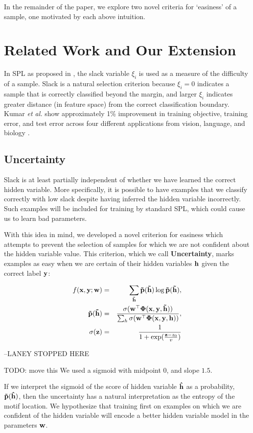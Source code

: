 \documentclass{article}
\newcommand{\mysection}[1]{\vspace{-4mm}\section{#1}\vspace{-4mm}}
\begin{document}
In the remainder of the paper, we explore two novel criteria for `easiness' of a sample, one motivated by each above intuition.

\mysection{Related Work and Our Extension}
\label{sec:related}
In SPL as proposed in \cite{SPL}, the slack variable $\xi_i$ is used as a measure of the difficulty of a sample.  Slack is a natural selection criterion because $\xi_i=0$ indicates a sample that is correctly classified beyond the margin, and larger $\xi_i$ indicates greater distance (in feature space) from the correct classification boundary. Kumar \textit{et al.} show approximately 1\% improvement in training objective, training error, and test error across four different applications from vision, language, and biology \cite{SPL}.

\subsection{Uncertainty}

Slack is at least partially independent of whether we have learned the correct hidden variable. More specifically, it is possible to have examples that we classify correctly with low slack despite having inferred the hidden variable incorrectly. Such examples will be included for training by standard SPL, which could cause us to learn bad parameters. 

With this idea in mind, we developed a novel criterion for easiness which attempts to prevent the selection of samples for which we are not confident about the hidden variable value. This criterion, which we call \textbf{Uncertainty}, marks examples as easy when we are certain of their hidden variables $\bf h$ given the correct label $\bf y$: 

\begin{eqnarray}
f(\bf x, \bf y; \bf w) &=& \sum_{\bf\tilde{h}} \bf\tilde p({\tilde h}) \log\bf\tilde p(\bf{\tilde h}),  \\
\bf{\tilde{p}(\tilde h)} &=&\frac{\sigma(\bf{w}^\top\Phi(\bf x,y, \tilde h))}{\sum_{h}\sigma(\bf w^\top\Phi(\bf x,\bf y,\bf h))}, \nonumber \\
\sigma(\bf z) &=& \frac{1}{1+\exp(\frac{{\bf z} - z_0}{v})} \nonumber
\label{eq:uncertainty}
\end{eqnarray}

--LANEY STOPPED HERE 

TODO: move this We used a sigmoid with midpoint $0$, and slope $1.5$.

If we interpret the sigmoid of the score of hidden variable $\bf \hat h$ as a probability, $\bf\tilde p(\bf \hat h)$, then the uncertainty has a natural interpretation as the entropy of the motif location.  We hypothesize that training first on examples on which we are confident of the hidden variable will encode a better hidden variable model in the parameters $\bf w$.
\end{document}
